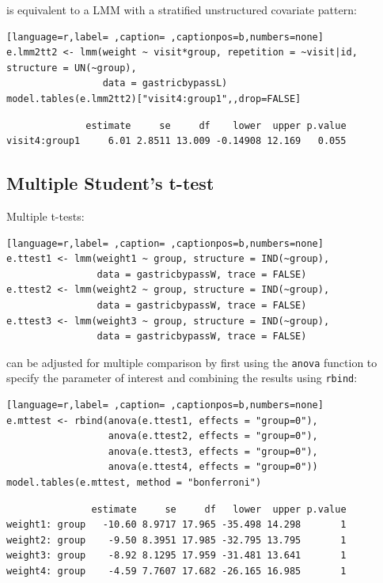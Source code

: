 \documentclass[12pt]{article}
\begin{document}
is equivalent to a LMM with a stratified unstructured covariate pattern:
\begin{lstlisting}[language=r,label= ,caption= ,captionpos=b,numbers=none]
e.lmm2tt2 <- lmm(weight ~ visit*group, repetition = ~visit|id, structure = UN(~group),
                 data = gastricbypassL)
model.tables(e.lmm2tt2)["visit4:group1",,drop=FALSE]
\end{lstlisting}

\begin{verbatim}
              estimate     se     df    lower  upper p.value
visit4:group1     6.01 2.8511 13.009 -0.14908 12.169   0.055
\end{verbatim}


\clearpage

\subsection{Multiple Student's t-test}
\label{sec:org622963b}


Multiple t-tests:
\begin{lstlisting}[language=r,label= ,caption= ,captionpos=b,numbers=none]
e.ttest1 <- lmm(weight1 ~ group, structure = IND(~group), 
                data = gastricbypassW, trace = FALSE)
e.ttest2 <- lmm(weight2 ~ group, structure = IND(~group), 
                data = gastricbypassW, trace = FALSE)
e.ttest3 <- lmm(weight3 ~ group, structure = IND(~group), 
                data = gastricbypassW, trace = FALSE)
\end{lstlisting}

can be adjusted for multiple comparison by first using the \texttt{anova}
function to specify the parameter of interest and combining the
results using \texttt{rbind}:
\begin{lstlisting}[language=r,label= ,caption= ,captionpos=b,numbers=none]
e.mttest <- rbind(anova(e.ttest1, effects = "group=0"),
                  anova(e.ttest2, effects = "group=0"),
                  anova(e.ttest3, effects = "group=0"),
                  anova(e.ttest4, effects = "group=0"))
model.tables(e.mttest, method = "bonferroni")
\end{lstlisting}

\begin{verbatim}
               estimate     se     df   lower  upper p.value
weight1: group   -10.60 8.9717 17.965 -35.498 14.298       1
weight2: group    -9.50 8.3951 17.985 -32.795 13.795       1
weight3: group    -8.92 8.1295 17.959 -31.481 13.641       1
weight4: group    -4.59 7.7607 17.682 -26.165 16.985       1
\end{verbatim}
\end{document}
